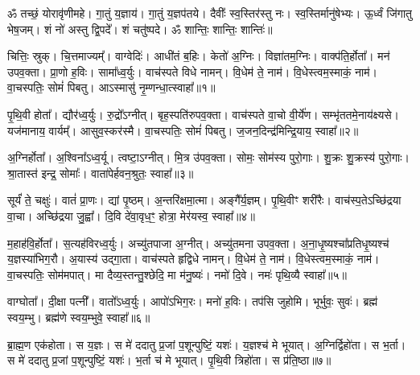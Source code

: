 \setcounter{anuvakam}{0}
ॐ तच्छं॒ योरावृ॑णीमहे। 
गा॒तुं य॒ज्ञाय॑। 
गा॒तुं य॒ज्ञप॑तये। 
दैवीः᳚ स्व॒स्तिर॑स्तु नः। 
स्व॒स्तिर्मानु॑षेभ्यः। 
ऊ॒र्ध्वं जि॑गातु भेष॒जम्। 
शं नो॑ अस्तु द्वि॒पदे᳚। 
शं चतु॑ष्पदे। 
ॐ शान्तिः॒ शान्तिः॒ शान्तिः॑॥

चित्तिः॒ स्रुक्। 
चि॒त्तमाज्यम्᳚। 
वाग्वेदिः॑। 
आधी॑तं ब॒\ar{}हिः। 
केतो॑ अ॒ग्निः। 
विज्ञा॑तम॒ग्निः। 
वाक्प॑ति॒र्\mbox{}होता᳚। 
मन॑ उपव॒क्ता। 
प्रा॒णो ह॒विः। 
सामा᳚ध्व॒र्युः। 
वाच॑स्पते विधे नामन्। 
वि॒धेम॑ ते॒ नाम॑। 
वि॒धेस्त्वम॒स्माकं॒ नाम॑। 
वा॒चस्पतिः॒ सोमं॑ पिबतु। 
आऽस्मासु॑ नृ॒म्णन्धा॒त्स्वाहा᳚॥१॥
\anuvakamend[अ॒ध्व॒र्युः पञ्च॑ च]

पृ॒थि॒वी होता᳚। 
द्यौर॑ध्व॒र्युः। 
रु॒द्रो᳚ऽग्नीत्। 
बृह॒स्पति॑रुपव॒क्ता। 
वाच॑स्पते वा॒चो वी॒र्ये॑ण। 
सम्भृ॑ततमे॒नाय॑क्ष्यसे। 
यज॑मानाय॒ वार्यम्᳚। 
आसुव॒स्कर॑स्मै। 
वा॒चस्पतिः॒ सोमं॑ पिबतु। 
ज॒जन॒दिन्द्र॑\-मिन्द्रि॒याय॒ स्वाहा᳚॥२॥%
\anuvakamend[पृ॒थि॒वी होता॒ दश॑]

अ॒ग्निर्\mbox{}होता᳚। 
अ॒श्विना᳚ऽध्व॒र्यू। 
त्वष्टा॒ऽग्नीत्। 
मि॒त्र उ॑पव॒क्ता। 
सोमः॒ सोम॑स्य पुरो॒गाः। 
शु॒क्रः  शु॒क्रस्य॑ पुरो॒गाः। 
श्रा॒तास्त॑ इन्द्र॒ सोमाः᳚। 
वाता॑पेर्\mbox{}हवन॒श्रुतः॒ स्वाहा᳚॥३॥%
\anuvakamend[अ॒ग्निर्होता॒ऽष्टौ]

सूर्यं॑ ते॒ चक्षुः॑। 
वातं॑ प्रा॒णः। 
द्यां पृ॒ष्ठम्। 
अ॒न्तरि॑क्षमा॒त्मा। 
अङ्गै᳚र्\mbox{}य॒ज्ञम्। 
पृ॒थि॒वीꣳ शरी॑रैः। 
वाच॑स्प॒तेऽच्छि॑द्रया वा॒चा। 
अच्छि॑द्रया जु॒ह्वा᳚। 
दि॒वि दे॑वा॒वृध॒ꣳ॒ होत्रा॒ मेर॑यस्व॒ स्वाहा᳚॥४॥
\anuvakamend[सूर्यं॑ ते॒ नव॑]

म॒हाह॑वि॒र्\mbox{}होता᳚। 
स॒त्यह॑विरध्व॒र्युः। 
अच्यु॑तपाजा अ॒ग्नीत्। 
अच्यु॑तमना उपव॒क्ता। 
अ॒ना॒धृ॒ष्यश्चा᳚प्रतिधृ॒ष्यश्च॑ य॒ज्ञस्या॑भिग॒रौ। 
अ॒यास्य॑ उद्गा॒ता। 
वाच॑स्पते हृद्विधे नामन्। 
वि॒धेम॑ ते॒ नाम॑। 
वि॒धेस्त्वम॒स्माकं॒ नाम॑। 
वा॒चस्पतिः॒ सोम॑मपात्। 
मा दैव्य॒स्तन्तु॒श्छेदि॒ मा म॑नु॒ष्यः॑। 
नमो॑ दि॒वे। 
नमः॑ पृथि॒व्यै स्वाहा᳚॥५॥%
\anuvakamend[अ॒पा॒त्त्रीणि॑ च]

वाग्घोता᳚। 
दी॒क्षा पत्नी᳚। 
वातो᳚ऽध्व॒र्युः। 
आपो॑ऽभिग॒रः। 
मनो॑ ह॒विः। 
तप॑सि जुहोमि। 
भूर्भुवः॒ सुवः॑। 
ब्रह्म॑ स्वय॒म्भु। 
ब्रह्म॑णे स्वय॒म्भुवे॒ स्वाहा᳚॥६॥
\anuvakamend[वाग्घोता॒ नव॑]

ब्रा॒ह्म॒ण एक॑होता। 
स य॒ज्ञः। 
स मे॑ ददातु प्र॒जां प॒शून्पुष्टिं॒ यशः॑। 
य॒ज्ञश्च॑ मे भूयात्। 
अ॒ग्निर्द्विहो॑ता। 
स भ॒र्ता। 
स मे॑ ददातु प्र॒जां प॒शून्पुष्टिं॒ यशः॑। 
भ॒र्ता च॑ मे भूयात्। 
पृ॒थि॒वी त्रिहो॑ता। 
स प्र॑ति॒ष्ठा॥७॥

